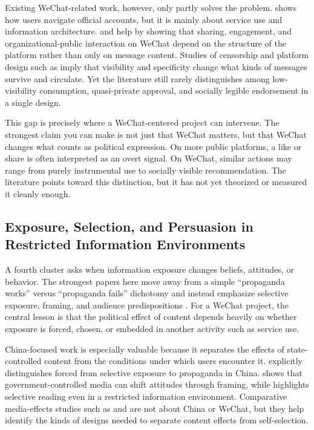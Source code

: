 \documentclass[12pt]{article}
\begin{document}
        Existing WeChat-related work, however, only partly solves the problem. \citet{jiang_2021_government_information_quarterly} shows how users navigate official accounts, but it is mainly about service use and information architecture. \citet{Xu2022WeChat} and \citet{TsaiMen2018} help by showing that sharing, engagement, and organizational-public interaction on WeChat depend on the structure of the platform rather than only on message content. Studies of censorship and platform design such as \citet{tai_2020_journal_of_communication} imply that visibility and specificity change what kinds of messages survive and circulate. Yet the literature still rarely distinguishes among low-visibility consumption, quasi-private approval, and socially legible endorsement in a single design.

        This gap is precisely where a WeChat-centered project can intervene. The strongest claim you can make is not just that WeChat matters, but that WeChat changes what counts as political expression. On more public platforms, a like or share is often interpreted as an overt signal. On WeChat, similar actions may range from purely instrumental use to socially visible recommendation. The literature points toward this distinction, but it has not yet theorized or measured it cleanly enough.

        \subsection{Exposure, Selection, and Persuasion in Restricted Information Environments}

        A fourth cluster asks when information exposure changes beliefs, attitudes, or behavior. The strongest papers here move away from a simple ``propaganda works'' versus ``propaganda fails'' dichotomy and instead emphasize selective exposure, framing, and audience predispositions \citep{pan_2022_psrm,shen_2025_psrm,WangWestwood2024,allcott_2020_aer,levy_2021_aer,PanXu2018}. For a WeChat project, the central lesson is that the political effect of content depends heavily on whether exposure is forced, chosen, or embedded in another activity such as service use.

        China-focused work is especially valuable because it separates the effects of state-controlled content from the conditions under which users encounter it. \citet{shen_2025_psrm} explicitly distinguishes forced from selective exposure to propaganda in China. \citet{pan_2022_psrm} shows that government-controlled media can shift attitudes through framing, while \citet{WangWestwood2024} highlights selective reading even in a restricted information environment. Comparative media-effects studies such as \citet{allcott_2020_aer} and \citet{levy_2021_aer} are not about China or WeChat, but they help identify the kinds of designs needed to separate content effects from self-selection.
\end{document}
